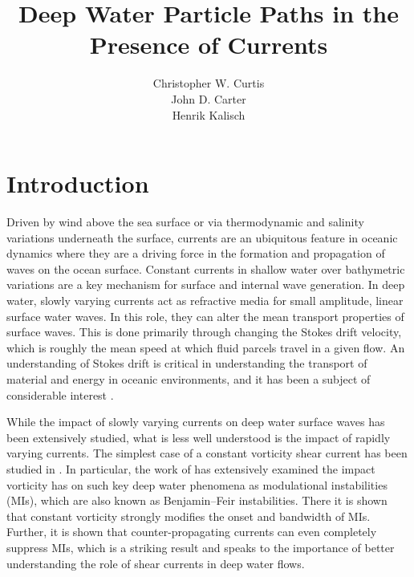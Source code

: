 \documentclass[a4paper,11pt]{article}
\title{Deep Water Particle Paths in the Presence of Currents}
\author{Christopher W. Curtis\\ John D. Carter\\ Henrik Kalisch}
\date{}
\begin{document}
\maketitle

\section{Introduction}

Driven by wind above the sea surface or via thermodynamic and salinity variations underneath the surface, currents are an ubiquitous feature in oceanic dynamics where they are a driving force in the formation and propagation of waves on the ocean surface.  Constant currents in shallow water over bathymetric variations are a key mechanism for surface and internal wave generation.  In deep water, slowly varying currents act as refractive media for small amplitude, linear surface water waves.  In this role, they can alter the mean transport properties of surface waves.  This is done primarily through changing the Stokes drift velocity, which is roughly the mean speed at which fluid parcels travel in a given flow.  An understanding of Stokes drift is critical in understanding the transport of material and energy in oceanic environments, and it has been a subject of considerable interest \cite{breivik,webb}.  

While the impact of slowly varying currents on deep water surface waves has been extensively studied, what is less well understood is the impact of rapidly varying currents.  The simplest case of a constant vorticity shear current has been studied in \cite{brevik,simmen,baumstein,choi,thomas2012nonlinear}.  In particular, the work of \cite{thomas2012nonlinear} has extensively examined the impact vorticity has on such key deep water phenomena as modulational instabilities (MIs), which are also known as Benjamin--Feir instabilities.  There it is shown that constant vorticity strongly modifies the onset and bandwidth of MIs.  Further, it is shown that counter-propagating currents can even completely suppress MIs, which is a striking result and speaks to the importance of better understanding the role of shear currents in deep water flows.  
\end{document}
